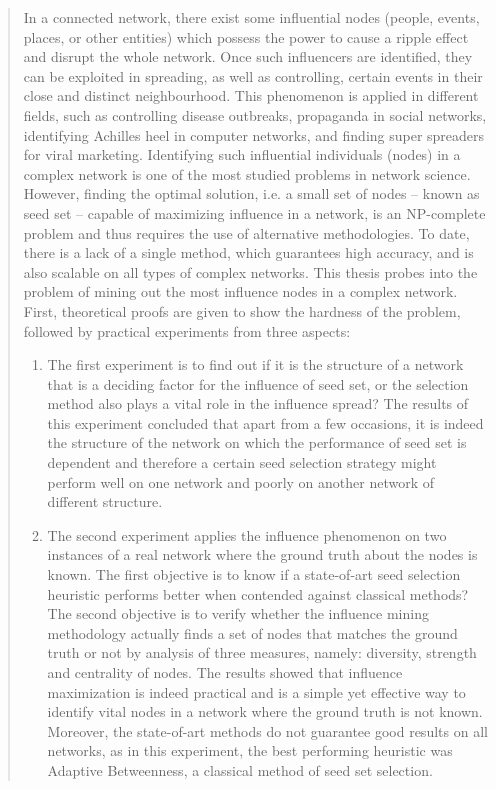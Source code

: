 \begin{abstract}
In a connected network, there exist some influential nodes (people, events, places, or other entities) which possess the power to cause a ripple effect and disrupt the whole network. Once such influencers are identified, they can be exploited in spreading, as well as controlling, certain events in their close and distinct neighbourhood. This phenomenon is applied in different fields, such as controlling disease outbreaks, propaganda in social networks, identifying Achilles heel in computer networks, and finding super spreaders for viral marketing. Identifying such influential individuals (nodes) in a complex network is one of the most studied problems in network science. However, finding the optimal solution, i.e. a small set of nodes -- known as seed set -- capable of maximizing influence in a network, is an NP-complete problem and thus requires the use of alternative methodologies. To date, there is a lack of a single method, which guarantees high accuracy, and is also scalable on all types of complex networks. This thesis probes into the problem of mining out the most influence nodes in a complex network. First, theoretical proofs are given to show the hardness of the problem, followed by practical experiments from three aspects:

\begin{enumerate}
	\item The first experiment is to find out if it is the structure of a network that is a deciding factor for the influence of seed set, or the selection method also plays a vital role in the influence spread? The results of this experiment concluded that apart from a few occasions, it is indeed the structure of the network on which the performance of seed set is dependent and therefore a certain seed selection strategy might perform well on one network and poorly on another network of different structure.
	
	\item The second experiment applies the influence phenomenon on two instances of a real network where the ground truth about the nodes is known. The first objective is to know if a state-of-art seed selection heuristic performs better when contended against classical methods? The second objective is to verify whether the influence mining methodology actually finds a set of nodes that matches the ground truth or not by analysis of three measures, namely: diversity, strength and centrality of nodes. The results showed that influence maximization is indeed practical and is a simple yet effective way to identify vital nodes in a network where the ground truth is not known. Moreover, the state-of-art methods do not guarantee good results on all networks, as in this experiment, the best performing heuristic was Adaptive Betweenness, a classical method of seed set selection.
	

\end{enumerate}
\end{abstract}
